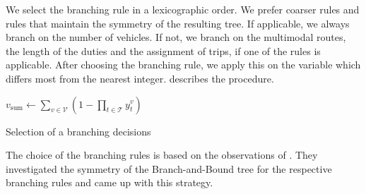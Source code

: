 We select the branching rule in a lexicographic order. We prefer coarser rules and rules that maintain the symmetry of the resulting tree. If applicable, we always branch on the number of vehicles. If not, we branch on the multimodal routes, the length of the duties and the assignment of trips, if one of the rules is applicable. After choosing the branching rule, we apply this on the variable which differs most from the nearest integer.  describes the procedure.

\begin{algorithm}[hbt]
	\SetAlgoLined
	$v_{\operatorname{sum}}\gets\sum_{v\in\mathcal{V}}\left(1-\prod_{t\in\mathcal{T}}y^v_t\right)$\;
	\caption{Selection of a branching decisions}
	\label{alg:branching_decision}
\end{algorithm}

The choice of the branching rules is based on the observations of \cite[Sec.~8.3]{Kaiser}. They investigated the symmetry of the Branch-and-Bound tree for the respective branching rules and came up with this strategy.